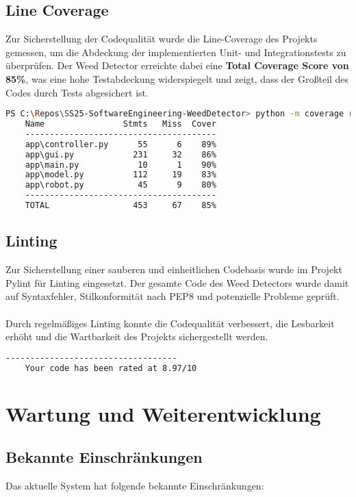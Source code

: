\documentclass[12pt, a4paper]{scrreprt}
\begin{document}
\section{Line Coverage}
Zur Sicherstellung der Codequalität wurde die Line-Coverage des Projekts gemessen, um die Abdeckung der implementierten Unit- und Integrationstests zu überprüfen. Der Weed Detector erreichte dabei eine \textbf{Total Coverage Score von 85\%}, was eine hohe Testabdeckung widerspiegelt und zeigt, dass der Großteil des Codes durch Tests abgesichert ist.\\

\begin{lstlisting}[language=Bash, caption=Line Coverage]
PS C:\Repos\SS25-SoftwareEngineering-WeedDetector> python -m coverage report
    Name                Stmts   Miss  Cover
    ---------------------------------------
    app\controller.py      55      6    89%
    app\gui.py            231     32    86%
    app\main.py            10      1    90%
    app\model.py          112     19    83%
    app\robot.py           45      9    80%
    ---------------------------------------
    TOTAL                 453     67    85%
\end{lstlisting}

\section{Linting}
Zur Sicherstellung einer sauberen und einheitlichen Codebasis wurde im Projekt Pylint für Linting eingesetzt. Der gesamte Code des Weed Detectors wurde damit auf Syntaxfehler, Stilkonformität nach PEP8 und potenzielle Probleme geprüft.\\
\\
Durch regelmäßiges Linting konnte die Codequalität verbessert, die Lesbarkeit erhöht und die Wartbarkeit des Projekts sichergestellt werden.\\

\begin{lstlisting}[language=Bash, caption=Pylint Score]
    -----------------------------------
    Your code has been rated at 8.97/10
\end{lstlisting} 


\chapter{Wartung und Weiterentwicklung}

\section{Bekannte Einschränkungen}
Das aktuelle System hat folgende bekannte Einschränkungen:
\end{document}
